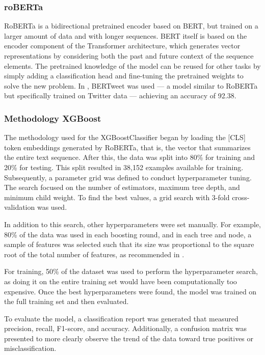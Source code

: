 \subsubsection{roBERTa}
RoBERTa is a bidirectional pretrained encoder based on BERT, but trained on a larger amount of data and with longer sequences. BERT itself is based on the encoder component of the Transformer architecture, which generates vector representations by considering both the past and future context of the sequence elements. The pretrained knowledge of the model can be reused for other tasks by simply adding a classification head and fine-tuning the pretrained weights to solve the new problem. In \cite{bonetti2021hate}, BERTweet was used — a model similar to RoBERTa but specifically trained on Twitter data — achieving an accuracy of 92.38.

\subsubsection{Methodology XGBoost}

The methodology used for the XGBoostClassifier began by loading the [CLS] token embeddings generated by RoBERTa, that is, the vector that summarizes the entire text sequence. After this, the data was split into 80\% for training and 20\% for testing. This split resulted in 38,152 examples available for training. Subsequently, a parameter grid was defined to conduct hyperparameter tuning. The search focused on the number of estimators, maximum tree depth, and minimum child weight. To find the best values, a grid search with 3-fold cross-validation was used.

In addition to this search, other hyperparameters were set manually. For example, 80\% of the data was used in each boosting round, and in each tree and node, a sample of features was selected such that its size was proportional to the square root of the total number of features, as recommended in \cite{Chen2016XGBoost}.

For training, 50\% of the dataset was used to perform the hyperparameter search, as doing it on the entire training set would have been computationally too expensive. Once the best hyperparameters were found, the model was trained on the full training set and then evaluated.

To evaluate the model, a classification report was generated that measured precision, recall, F1-score, and accuracy. Additionally, a confusion matrix was presented to more clearly observe the trend of the data toward true positives or misclassification.

